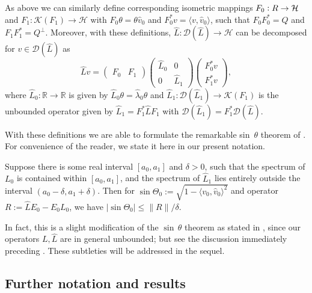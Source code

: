 \documentclass{aptpub}
\newcommand{\R}{\mathbb R}
\newcommand{\Dom}{\mathcal D}
\renewcommand{\H}{\mathcal H}
\begin{document}
As above we can similarly define corresponding isometric mappings $F_0:\mathcal \R\to \H$ and $F_1:\mathcal K(F_1)\to \H$ with $F_0 \theta = \theta \widehat{v}_0$ and $F_0^* v = \langle v,\widehat{v}_0 \rangle$, such that $F_0 F_0^* = Q$ and $F_1F_1^*=Q^\perp$. 
Moreover, with these definitions, 
$\widehat{L} \colon \Dom(\widehat{L})\to \mathcal{H} $ can be decomposed for
$v\in \Dom(\widehat L)$ as
\begin{equation}
    \widehat L v = 
    \begin{pmatrix}
        F_0 & F_1
    \end{pmatrix}
    \begin{pmatrix}
        \widehat L_0 & 0 \\
        0 & \widehat L_1 
    \end{pmatrix}
    \begin{pmatrix}
        F_0^*v \\
        F_1^*v
    \end{pmatrix},
    \label{eq:decom_hatA}
\end{equation}
where $\widehat{L}_0\colon \mathbb{R} \to \mathbb{R}$ is given by $\widehat{L}_0\theta = \widehat{\lambda}_0 \theta $ and $\widehat{L}_1 \colon \mathcal{D}(\widehat{L}_1) \to \mathcal{K}(F_1)$ is the unbounded operator given by $\widehat{L}_1 = F_1^* \widehat{L} F_1$ with $\mathcal{D}(\widehat{L}_1) = F_1^* \mathcal{D}(\widehat{L})$.


With these definitions we are able to formulate the remarkable sin~$\theta$ theorem of \cite{DavisKahan1970}. For convenience of the reader, we state it here in our present notation.
\begin{theorem}
    Suppose there is some real interval $[a_0, a_1]$ and  $\delta>0$, such that the spectrum of $L_0$ is contained within $[a_0, a_1]$, and the spectrum of $\widehat L_1$ 
    lies
    entirely outside the interval $(a_0-\delta, a_1+\delta)$. Then for $\sin \Theta_0 := \sqrt{1-\langle v_0,\widehat v_0 \rangle^2}$ and operator $R:=\widehat LE_0 - E_0 L_0$, we have $|\sin \Theta_0|\le \|R \|/\delta $.
\end{theorem}
In fact, this is a slight modification of the $\sin \,\theta$ theorem as stated in \cite{DavisKahan1970}, since our operators $L, \widehat L$ are in general unbounded; but see the discussion immediately preceding \cite[Theorem 5.2]{DavisKahan1970}. These subtleties will be addressed in the sequel.


 \subsection{Further notation and results}
\end{document}
